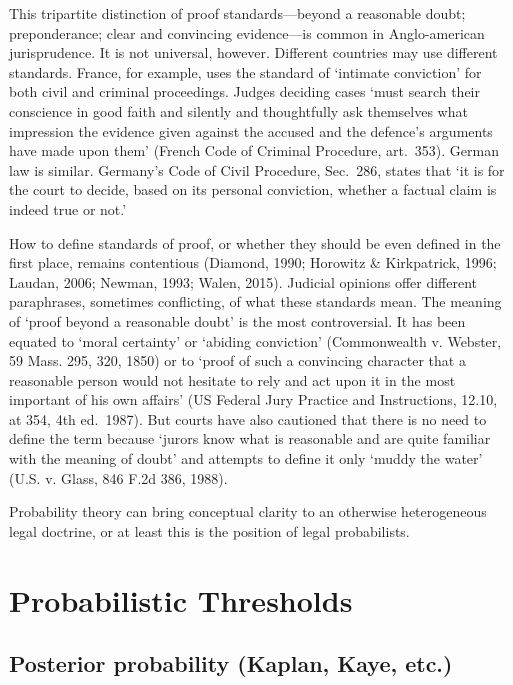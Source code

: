 \documentclass[10pt,dvipsnames]{scrartcl}
\begin{document}
This tripartite distinction of proof standards---beyond a reasonable
doubt; preponderance; clear and convincing evidence---is common in
Anglo-american jurisprudence. It is not universal, however. Different
countries may use different standards. France, for example, uses the
standard of `intimate conviction' for both civil and criminal
proceedings. Judges deciding cases `must search their conscience in good
faith and silently and thoughtfully ask themselves what impression the
evidence given against the accused and the defence's arguments have made
upon them' (French Code of Criminal Procedure, art.~353). German law is
similar. Germany's Code of Civil Procedure, Sec.~286, states that `it is
for the court to decide, based on its personal conviction, whether a
factual claim is indeed true or not.'

How to define standards of proof, or whether they should be even defined
in the first place, remains contentious (Diamond, 1990; Horowitz \&
Kirkpatrick, 1996; Laudan, 2006; Newman, 1993; Walen, 2015). Judicial
opinions offer different paraphrases, sometimes conflicting, of what
these standards mean. The meaning of `proof beyond a reasonable doubt'
is the most controversial. It has been equated to `moral certainty' or
`abiding conviction' (Commonwealth v. Webster, 59 Mass. 295, 320, 1850)
or to `proof of such a convincing character that a reasonable person
would not hesitate to rely and act upon it in the most important of his
own affairs' (US Federal Jury Practice and Instructions, 12.10, at 354,
4th ed.~1987). But courts have also cautioned that there is no need to
define the term because `jurors know what is reasonable and are quite
familiar with the meaning of doubt' and attempts to define it only
`muddy the water' (U.S. v. Glass, 846 F.2d 386, 1988).

Probability theory can bring conceptual clarity to an otherwise
heterogeneous legal doctrine, or at least this is the position of legal
probabilists.

\section{Probabilistic Thresholds}\label{probabilistic-thresholds}

\subsection{Posterior probability (Kaplan, Kaye,
etc.)}\label{posterior-probability-kaplan-kaye-etc.}
\end{document}
